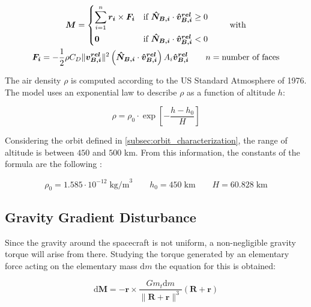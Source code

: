 \begin{equation}
	\begin{gathered}
		\boldsymbol{M} =
		\begin{dcases*}
			\sum_{i=1}^{n} \boldsymbol{r_i} \times \boldsymbol{F_i} &
			if $\boldsymbol{\hat{N}_{B,i}} \cdot \boldsymbol{\hat{v}_{B,i}^{rel}} \geq 0$ \\
			\boldsymbol{0} &
			if $\boldsymbol{\hat{N}_{B,i}} \cdot \boldsymbol{\hat{v}_{B,i}^{rel}} < 0$
		\end{dcases*}
		\qquad \text{with} \\
		\boldsymbol{F_i} = -\frac{1}{2} \rho C_D \lVert \boldsymbol{v_{B,i}^{rel}} \rVert^2 \left( \boldsymbol{\hat{N}_{B,i}} \cdot \boldsymbol{\hat{v}_{B,i}^{rel}} \right) A_i \boldsymbol{\hat{v}_{B,i}^{rel}} \qquad n = \text{number of faces}
	\end{gathered}
\end{equation}

The air density $\rho$ is computed according to the US Standard Atmosphere of 1976. The model uses an exponential law to describe $\rho$ as a function of altitude $h$:

\begin{equation}
	\rho = \rho_0 \cdot \exp \left[ -\frac{h - h_0}{H} \right]
\end{equation}

Considering the orbit defined in \autoref{subsec:orbit_characterization}, the range of altitude is between $450$ and $500$ km. From this information, the constants of the formula are the following \cite{wertz}:

\begin{equation*}
	\rho_0 = 1.585 \cdot 10^{-12} \; \text{kg/m}^3 \qquad
	h_0 = 450 \; \text{km} \qquad
	H = 60.828 \; \text{km}
\end{equation*}


\subsection{Gravity Gradient Disturbance}
\label{subsec:dist_GG}

Since the gravity around the spacecraft is not uniform, a non-negligible gravity torque will arise from there. Studying the torque generated by an elementary force acting on the elementary mass $\mathrm{d}m$ the equation for this is obtained:

\begin{equation}
	\mathrm{d} \boldsymbol{M} = -\boldsymbol{r} \times \frac{G m_t \mathrm{d}m}{\lVert \boldsymbol{R} + \boldsymbol{r} \rVert ^3} \left( \boldsymbol{R} + \boldsymbol{r} \right)
\end{equation}

